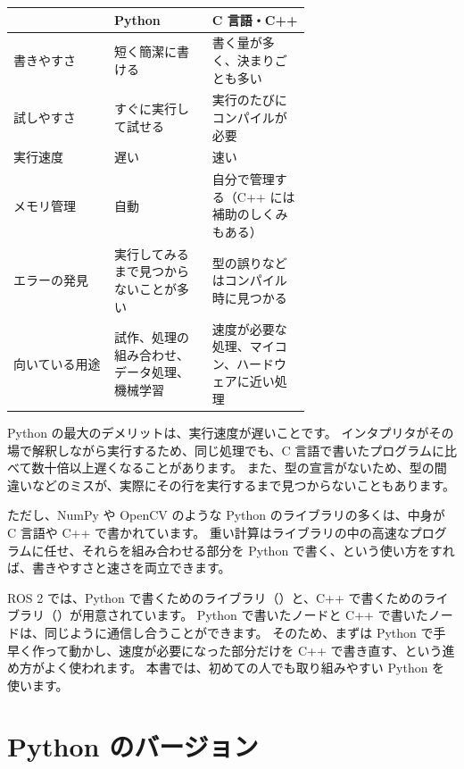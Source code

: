 \begin{tablebox}
  \begin{tabular}{lp{0.33\linewidth}p{0.33\linewidth}}
    \toprule
     & Python & C 言語・C++ \\
    \midrule
    書きやすさ & 短く簡潔に書ける & 書く量が多く、決まりごとも多い \\
    試しやすさ & すぐに実行して試せる & 実行のたびにコンパイルが必要 \\
    実行速度 & 遅い & 速い \\
    メモリ管理 & 自動 & 自分で管理する（C++ には補助のしくみもある） \\
    エラーの発見 & 実行してみるまで見つからないことが多い & 型の誤りなどはコンパイル時に見つかる \\
    向いている用途 & 試作、処理の組み合わせ、データ処理、機械学習 & 速度が必要な処理、マイコン、ハードウェアに近い処理 \\
    \bottomrule
  \end{tabular}
\end{tablebox}

Python の最大のデメリットは、実行速度が遅いことです。
インタプリタがその場で解釈しながら実行するため、同じ処理でも、C 言語で書いたプログラムに比べて数十倍以上遅くなることがあります。
また、型の宣言がないため、型の間違いなどのミスが、実際にその行を実行するまで見つからないこともあります。

ただし、NumPy や OpenCV のような Python のライブラリの多くは、中身が C 言語や C++ で書かれています。
重い計算はライブラリの中の高速なプログラムに任せ、それらを組み合わせる部分を Python で書く、という使い方をすれば、書きやすさと速さを両立できます。

\begin{point}[ロボット開発での使い分け]
  ROS 2 では、Python で書くためのライブラリ（）と、C++ で書くためのライブラリ（）が用意されています。
  Python で書いたノードと C++ で書いたノードは、同じように通信し合うことができます。
  そのため、まずは Python で手早く作って動かし、速度が必要になった部分だけを C++ で書き直す、という進め方がよく使われます。
  本書では、初めての人でも取り組みやすい Python を使います。
\end{point}

\section{Python のバージョン}
\label{sec:python-version}

